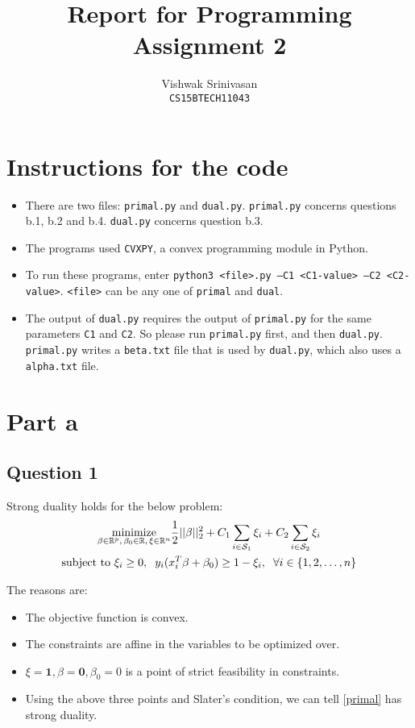 \documentclass{article}
\title{Report for Programming Assignment 2}
\author{Vishwak Srinivasan\\
\texttt{CS15BTECH11043}}
\date{}
\newcommand{\setS}{\mathcal{S}}
\newcommand{\real}{\mathbb{R}}
\newcommand{\minimize}{\mathop{\mathrm{minimize}}}
\newcommand{\minimizewrt}[1]{\underset{#1}{\minimize}}
\begin{document}
\maketitle

\section*{Instructions for the code}
\begin{itemize}
\item There are two files: \texttt{primal.py} and \texttt{dual.py}. \texttt{primal.py} concerns questions b.1, b.2 and b.4. \texttt{dual.py} concerns question b.3.
\item The programs used \texttt{CVXPY}, a convex programming module in Python.
\item To run these programs, enter \texttt{python3 <file>.py --C1 <C1-value> --C2 <C2-value>}. \texttt{<file>} can be any one of \texttt{primal} and \texttt{dual}.
\item The output of \texttt{dual.py} requires the output of \texttt{primal.py} for the same parameters \texttt{C1} and \texttt{C2}. So please run \texttt{primal.py} first, and then \texttt{dual.py}. \texttt{primal.py} writes a \texttt{beta.txt} file that is used by \texttt{dual.py}, which also uses a \texttt{alpha.txt} file.
\end{itemize}

\section*{Part a}
\subsection*{Question 1}
\begin{flushleft}
Strong duality holds for the below problem:
\begin{multline}
\label{primal}
\minimizewrt{\beta \in \real^{p}, \hspace{0.5mm} \beta_{0} \in \real, \hspace{0.5mm} \xi \in \real^{n}} \frac{1}{2}||\beta||_{2}^{2} + C_{1}\sum_{i \in \setS_{1}} \xi_{i} + C_{2}\sum_{i \in \setS_{2}} \xi_{i} \\
\text{subject to } \xi_{i} \geq 0, \hspace{2mm} y_{i}(x_{i}^{T}\beta + \beta_{0}) \geq 1 - \xi_{i}, \hspace{2mm} \forall i \in \{1, 2, \ldots, n\}
\end{multline}

The reasons are:
\begin{itemize}
\item The objective function is convex.
\item The constraints are affine in the variables to be optimized over.
\item \(\xi = \mathbf{1}, \beta = \mathbf{0}, \beta_{0} = 0\) is a point of strict feasibility in constraints.
\item Using the above three points and Slater's condition, we can tell \ref{primal} has strong duality.
\end{itemize}
\end{flushleft}
\end{document}
